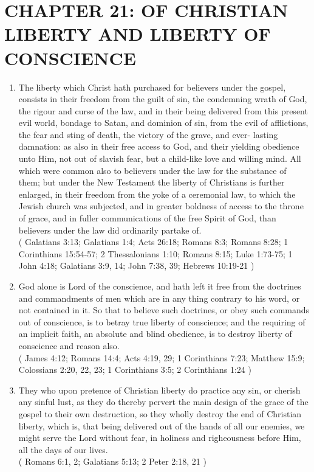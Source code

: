 \documentclass[12pt,a4paper]{book}
\begin{document}
\chapter{CHAPTER 21: OF CHRISTIAN LIBERTY AND LIBERTY OF CONSCIENCE}
\label{ch-lib}
\begin{enumerate}
\item The liberty which Christ hath purchased for believers under the gospel, consists in their freedom from the guilt of sin, the condemning wrath of God, the rigour and curse of the law, and in their being delivered from this present evil world, bondage to Satan, and dominion of sin, from the evil of afflictions, the fear and sting of death, the victory of the grave, and ever- lasting damnation: as also in their free access to God, and their yielding obedience unto Him, not out of slavish fear, but a child-like love and willing mind.
All which were common also to believers under the law for the substance of them; but under the New Testament the liberty of Christians is further enlarged, in their freedom from the yoke of a ceremonial law, to which the Jewish church was subjected, and in greater boldness of access to the throne of grace, and in fuller communications of the free Spirit of God, than believers under the law did ordinarily partake of.\\
( Galatians 3:13; Galatians 1:4; Acts 26:18; Romans 8:3; Romans 8:28; 1 Corinthians 15:54-57; 2 Thessalonians 1:10; Romans 8:15; Luke 1:73-75; 1 John 4:18; Galatians 3:9, 14; John 7:38, 39; Hebrews 10:19-21 )
\item God alone is Lord of the conscience, and hath left it free from the doctrines and commandments of men which are in any thing contrary to his word, or not contained in it. So that to believe such doctrines, or obey such commands out of conscience, is to betray true liberty of conscience; and the requiring of an implicit faith, an absolute and blind obedience, is to destroy liberty of conscience and reason also.\\
( James 4:12; Romans 14:4; Acts 4:19, 29; 1 Corinthians 7:23; Matthew 15:9; Colossians 2:20, 22, 23; 1 Corinthians 3:5; 2 Corinthians 1:24 )
\item They who upon pretence of Christian liberty do practice any sin, or cherish any sinful lust, as they do thereby pervert the main design of the grace of the gospel to their own destruction, so they wholly destroy the end of Christian liberty, which is, that being delivered out of the hands of all our enemies, we might serve the Lord without fear, in holiness and righeousness before Him, all the days of our lives.\\
( Romans 6:1, 2; Galatians 5:13; 2 Peter 2:18, 21 )
\end{enumerate}
\end{document}
